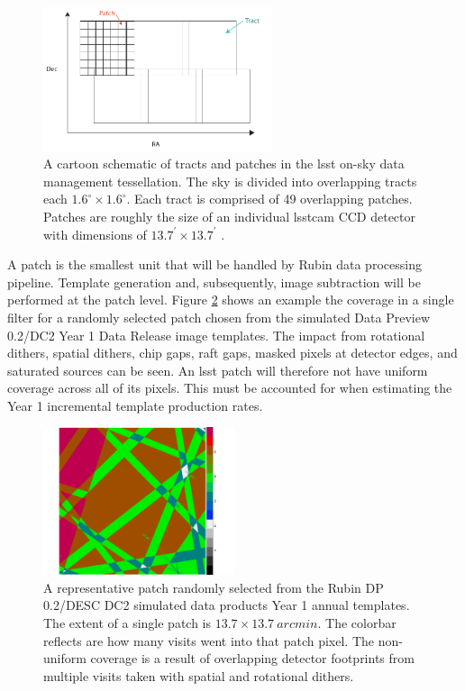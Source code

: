 \documentclass[preprintm,linenumbers]{aastex631}
\begin{document}
	\begin{figure}
		\centering
		\includegraphics[width=0.6\textwidth]{results/tracts_and_patches.pdf} 
		
		\caption{A cartoon schematic of tracts and patches in the \gls*{lsst} on-sky data management tessellation.
  The sky is divided into overlapping tracts each $1.6^{\circ} \times 1.6^{\circ}$. 
  Each tract is comprised of 49 overlapping patches. 
  Patches are roughly the size of an individual \gls*{lsstcam} CCD detector with dimensions of $13.7^{\prime} \times 13.7^{\prime}$ . }
		
		\label{fig:tractsandpatches}
	\end{figure}
	
	A patch is the smallest unit that will be handled by Rubin data processing pipeline. 
 Template generation and, subsequently, image subtraction will be performed at the patch level. 
 Figure \ref{fig:randompatch} shows an example the coverage in a single filter for a randomly selected patch chosen from the simulated Data Preview 0.2/DC2 \citep{2021ApJS..253...31L}  Year 1 Data Release image templates. 
 The impact from rotational dithers, spatial dithers, chip gaps, raft gaps, masked pixels at detector edges, and saturated sources can be seen. An \gls*{lsst} patch will therefore not have uniform coverage across all of its pixels. This must be accounted for when estimating the Year 1 incremental template production rates. 
	
	\begin{figure}
		\centering
		\includegraphics[width=0.5\textwidth]{results/dc2-random_single_patch_year1_coadd_depth.pdf} 
		
		\caption{A representative patch randomly selected from the Rubin DP 0.2/DESC DC2  \citep{2021ApJS..253...31L} simulated data products Year 1 annual templates. 
			The extent of a single patch is $13.7 \times 13.7\ \si{arcmin}$.
			The colorbar reflects are how many visits went into that patch pixel.
   The non-uniform coverage is a result of  overlapping detector footprints from multiple visits taken with spatial and rotational dithers.}
		
		\label{fig:randompatch}
	\end{figure}
	
\end{document}
